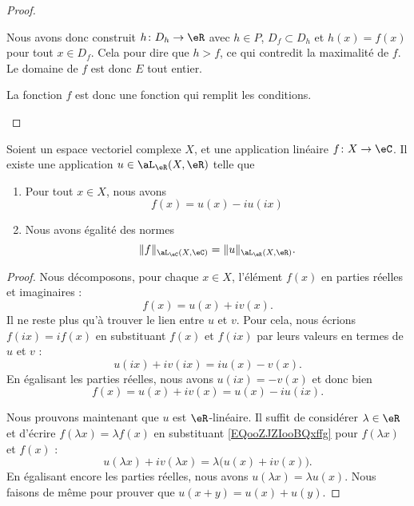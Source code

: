 \begin{proof}
\begin{subproof}
		Nous avons donc construit \( h\colon D_h\to \eR\) avec \( h\in P\), \( D_f\subset D_h\) et \( h(x)=f(x)\) pour tout \( x\in D_f\). Cela pour dire que \( h>f\), ce qui contredit la maximalité de \( f\). Le domaine de \( f\) est donc \( E\) tout entier.

		La fonction \( f\) est donc une fonction qui remplit les conditions.

	\end{subproof}
\end{proof}

\begin{lemma}
	Soient un espace vectoriel complexe \( X\), et une application linéaire \(f \colon X\to \eC  \). Il existe une application \( u\in \aL_\eR(X,\eR)\) telle que
	\begin{enumerate}
		\item
		      Pour tout \( x\in X\), nous avons
		      \begin{equation}
			      f(x)=u(x)-iu(ix)
		      \end{equation}
		\item
		      Nous avons égalité des normes		%
		      \begin{equation}
			      \| f \|_{\aL_\eC(X,\eC)}=\| u \|_{\aL_\eR(X,\eR)}.
		      \end{equation}
	\end{enumerate}
\end{lemma}

\begin{proof}
	Nous décomposons, pour chaque \( x\in X\), l'élément \( f(x)\) en parties réelles et imaginaires :
	\begin{equation}		\label{EQooZJZIooBQxffg}
		f(x)=u(x)+iv(x).
	\end{equation}
	Il ne reste plus qu'à trouver le lien entre \( u\) et \( v\). Pour cela, nous écrions \( f(ix)=if(x)\) en substituant \( f(x)\) et \( f(ix)\) par leurs valeurs en termes de \( u\) et \( v\) :
	\begin{equation}
		u(ix)+iv(ix)=iu(x)-v(x).
	\end{equation}
	En égalisant les parties réelles, nous avons \( u(ix)=-v(x)\) et donc bien
	\begin{equation}	\label{EQooZUTLooVzwRDM}
		f(x)=u(x)+iv(x)=u(x)-iu(ix).
	\end{equation}

	Nous prouvons maintenant que \( u\) est \( \eR\)-linéaire. Il suffit de considérer \( \lambda\in\eR\) et d'écrire \( f(\lambda x)=\lambda f(x)\) en substituant \eqref{EQooZJZIooBQxffg} pour \( f(\lambda x)\) et \( f(x)\) :
	\begin{equation}
		u(\lambda x)+iv(\lambda x)=\lambda\big( u(x)+iv(x) \big).
	\end{equation}
	En égalisant encore les parties réelles, nous avons \( u(\lambda x)=\lambda u(x)\). Nous faisons de même pour prouver que \( u(x+y)=u(x)+u(y)\).
\end{proof}


